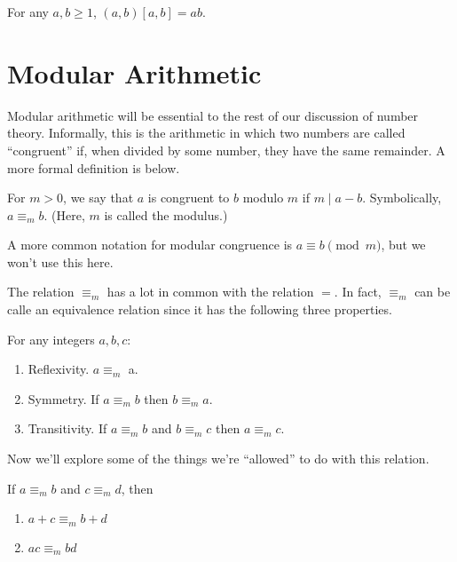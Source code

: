 \documentclass[../m55main.tex]{chapters}
\begin{document}
\begin{theorem}
    For any $a,b \geq 1$, $(a,b) [a,b] = ab$.
\end{theorem}


\section{Modular Arithmetic}
Modular arithmetic will be essential to the rest of our discussion of number theory.
Informally, this is the arithmetic in which two numbers are called ``congruent'' if, when divided by some number, they have the same remainder.
A more formal definition is below.

\begin{definition}
    For $m > 0$, we say that $a$ is congruent to $b$ modulo $m$ if $m \mid a - b$.
    Symbolically, $a \equiv_m b$.
    (Here, $m$ is called the modulus.)
\end{definition}

A more common notation for modular congruence is $a \equiv b \pmod m$, but we won't use this here.

The relation $\equiv_m$ has a lot in common with the relation $=$.
In fact, $\equiv_m$ can be calle an equivalence relation since it has the following three properties.

\begin{theorem}
    For any integers $a, b, c$:
    \begin{enumerate}[label=(\alph*)]
        \item Reflexivity. $a \equiv_m$ a.
        \item Symmetry. If $a \equiv_m b$ then $b \equiv_m a$.
        \item Transitivity. If $a \equiv_m b$ and $b \equiv_m c$ then $a \equiv_m c$.
    \end{enumerate}
\end{theorem}


Now we'll explore some of the things we're ``allowed'' to do with this relation.

\begin{theorem}
    If $a \equiv_m b$ and $c \equiv_m d$, then
    \begin{enumerate}[label=(\alph*)]
        \item $a + c \equiv_m b + d$
        \item $ac \equiv_m bd$
    \end{enumerate}
\end{theorem}
\end{document}
